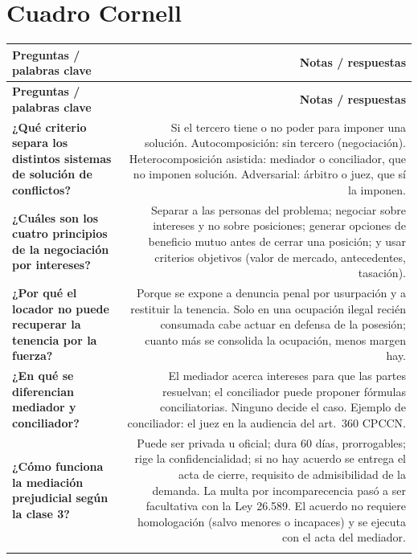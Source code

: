 \section{Cuadro Cornell}

\begin{longtable}{Q R}
\toprule
\textbf{Preguntas / palabras clave} & \textbf{Notas / respuestas} \\
\midrule
\endfirsthead
\toprule
\textbf{Preguntas / palabras clave} & \textbf{Notas / respuestas} \\
\midrule
\endhead

\textbf{¿Qué criterio separa los distintos sistemas de solución de conflictos?} &
Si el tercero tiene o no poder para imponer una solución. Autocomposición: sin tercero (negociación). Heterocomposición asistida: mediador o conciliador, que no imponen solución. Adversarial: árbitro o juez, que sí la imponen. \\
\addlinespace[0.6em]

\textbf{¿Cuáles son los cuatro principios de la negociación por intereses?} &
Separar a las personas del problema; negociar sobre intereses y no sobre posiciones; generar opciones de beneficio mutuo antes de cerrar una posición; y usar criterios objetivos (valor de mercado, antecedentes, tasación). \\
\addlinespace[0.6em]

\textbf{¿Por qué el locador no puede recuperar la tenencia por la fuerza?} &
Porque se expone a denuncia penal por usurpación y a restituir la tenencia. Solo en una ocupación ilegal recién consumada cabe actuar en defensa de la posesión; cuanto más se consolida la ocupación, menos margen hay. \\
\addlinespace[0.6em]

\textbf{¿En qué se diferencian mediador y conciliador?} &
El mediador acerca intereses para que las partes resuelvan; el conciliador puede proponer fórmulas conciliatorias. Ninguno decide el caso. Ejemplo de conciliador: el juez en la audiencia del art.\ 360 CPCCN. \\
\addlinespace[0.6em]

\textbf{¿Cómo funciona la mediación prejudicial según la clase 3?} &
Puede ser privada u oficial; dura 60 días, prorrogables; rige la confidencialidad; si no hay acuerdo se entrega el acta de cierre, requisito de admisibilidad de la demanda. La multa por incomparecencia pasó a ser facultativa con la Ley 26.589. El acuerdo no requiere homologación (salvo menores o incapaces) y se ejecuta con el acta del mediador. \\
\addlinespace[0.6em]


\end{longtable}
